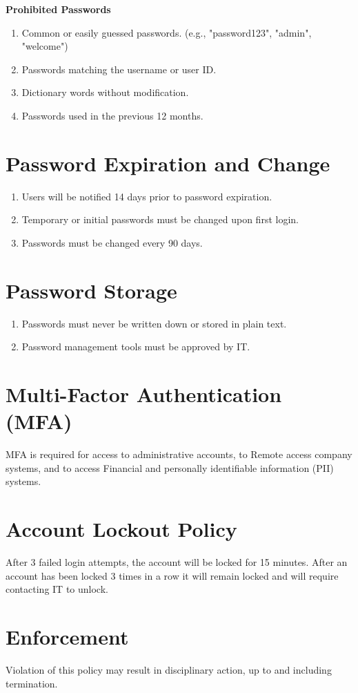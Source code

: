 \textbf{Prohibited Passwords}
\begin{enumerate}
    \item Common or easily guessed passwords. (e.g., "password123", "admin", "welcome")
    \item Passwords matching the username or user ID.
    \item Dictionary words without modification.
    \item Passwords used in the previous 12 months.
\end{enumerate}

\section{Password Expiration and Change}
\begin{enumerate}
    \item Users will be notified 14 days prior to password expiration.
    \item Temporary or initial passwords must be changed upon first login.
    \item Passwords must be changed every 90 days.
\end{enumerate}

\section{Password Storage}
\begin{enumerate}
    \item Passwords must never be written down or stored in plain text.
    \item Password management tools must be approved by IT.
\end{enumerate}

\section{Multi-Factor Authentication (MFA)}
MFA is required for access to administrative accounts, to Remote access company systems, and to access Financial and personally identifiable information (PII) systems.

\section{Account Lockout Policy}
After 3 failed login attempts, the account will be locked for 15 minutes. After an account has been locked 3 times in a row it will remain locked and will require contacting IT to unlock.

\section{Enforcement}
Violation of this policy may result in disciplinary action, up to and including termination.